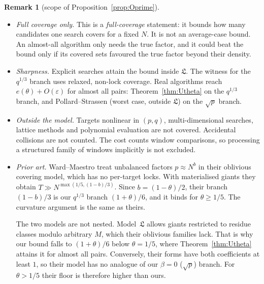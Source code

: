 \documentclass[11pt]{amsart}
\theoremstyle{definition}
\newtheorem{remark}[theorem]{Remark}
\begin{document}
\begin{remark}[scope of Proposition~\ref{prop:Oprime}]
\begin{itemize}
\item \emph{Full coverage only.} This is a \emph{full-coverage} statement: it bounds how many
  candidates one search covers for a fixed $N$. It is not an average-case bound. An almost-all
  algorithm only needs the true factor, and it could beat the bound only if its covered sets
  favoured the true factor beyond their density.
\item \emph{Sharpness.} Explicit searches attain the bound inside $\mathfrak L$. The witness for
  the $q^{1/3}$ branch uses relaxed, non-lock coverage. Real algorithms reach
  $e(\theta)+O(\varepsilon)$ for almost all pairs: Theorem~\ref{thm:Utheta} on the $q^{1/3}$
  branch, and Pollard--Strassen (worst case, outside $\mathfrak L$) on the $\sqrt p$ branch.
\item \emph{Outside the model.} Targets nonlinear in $(p,q)$, multi-dimensional searches,
  lattice methods and polynomial evaluation are not covered. Accidental collisions are not
  counted. The cost counts window comparisons, so processing a structured family of windows
  implicitly is not excluded.
\item \emph{Prior art.} Ward--Maestro \cite[Prop.~3.7]{wardmaestro2026} treat unbalanced
  factors $p\approx N^{b}$ in their oblivious covering model, which has no per-target locks.
  With materialised giants they obtain $T\gg N^{\max(1/5,(1-b)/3)}$. Since $b=(1-\theta)/2$,
  their branch $(1-b)/3$ is our $q^{1/3}$ branch $(1+\theta)/6$, and it binds for
  $\theta\ge1/5$. The curvature argument is the same as theirs.

  The two models are not nested. Model~$\mathfrak L$ allows giants restricted to residue
  classes modulo arbitrary $M$, which their oblivious families lack. That is why our bound falls
  to $(1+\theta)/6$ below $\theta=1/5$, where Theorem~\ref{thm:Utheta} attains it for almost all
  pairs. Conversely, their forms have both coefficients at least $1$, so their model has no
  analogue of our $\beta=0$ ($\sqrt p$) branch. For $\theta>1/5$ their floor is therefore
  higher than ours.
\end{itemize}
\end{remark}
\end{document}

